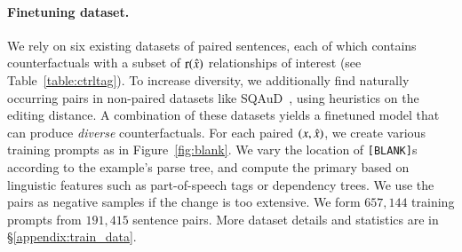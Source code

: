 
\paragraph{Finetuning dataset.}
We rely on six existing datasets of paired sentences, each of which contains counterfactuals with a subset of $\operatorname*{r}(\hat{x})$ relationships of interest (see Table~\ref{table:ctrltag}). 
To increase diversity, we additionally find naturally occurring pairs in non-paired datasets like SQAuD~\cite{rajpurkar-etal-2016-squad}, using heuristics on the editing distance. 
A combination of these datasets yields a finetuned model that can produce \emph{diverse} counterfactuals.
For each paired $(x, \hat{x})$, we create various training prompts as in Figure~\ref{fig:blank}.
We vary the location of \texttt{[BLANK]}s according to the example's parse tree, and compute the primary \tagstrshort based on linguistic features such as part-of-speech tags or dependency trees.
We use the pairs as negative samples if the change is too extensive.
We form $657,144$ training prompts from $191,415$ sentence pairs. 
More dataset details and \tagstrshort statistics are in \S\ref{appendix:train_data}.




